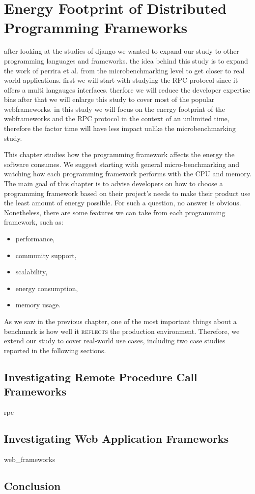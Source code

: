 \chapter{Energy Footprint of Distributed Programming Frameworks}
\label{chapter:porgramming_langauges}


after looking at the studies of django we wanted to expand our study to other programming languages and frameworks.
the idea behind this study is to expand the work of perrira et al. from the microbenchmarking level to get closer to real world applications.
first we will start with studying the RPC protocol since it offers a multi langauges interfaces. therfore we will reduce the developer expertise bias 
after that we will enlarge this study to cover most of the popular webframeworks. in this study we will focus on the energy footprint of the webframeworks and the RPC protocol in the context of an unlimited time, therefore the factor time will have less impact unlike the microbenchmarking study. 

This chapter studies how the programming framework affects the energy the software consumes.
We suggest starting with general micro-benchmarking and watching how each programming framework performs with the CPU and memory.
The main goal of this chapter is to advise developers on how to choose a programming framework based on their project's needs to make their product use the least amount of energy possible.
For such a question, no answer is obvious.
Nonetheless, there are some features we can take from each programming framework, such as:
\begin{itemize}
    \item performance,
    \item community support,
    \item scalability,
    \item energy consumption,
    \item memory usage.
\end{itemize}

As we saw in the previous chapter, one of the most important things about a benchmark is how well it \textsc{reflects} the production environment.
Therefore, we extend our study to cover real-world use cases, including two case studies reported in the following sections.

\section{Investigating Remote Procedure Call Frameworks}
{rpc}


\section{Investigating Web Application Frameworks}
{web_frameworks}

\section{Conclusion }
